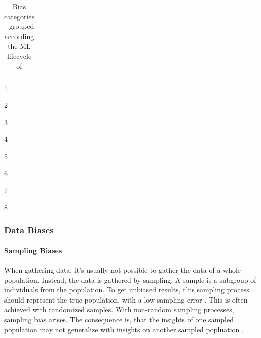 \begin{refsection}
\begin{table}[H]
\begin{threeparttable}
\begin{tabularx}{\textwidth}{>{\tblWidthDescription}X|>{\tblWidthContext}X|>{\tblWidthContext}X}
					\bottomrule
				\end{tabularx}
				\begin{tablenotes}
					\footnotesize
					\begin{minipage}{0.33\textwidth}\raggedright
						\item[1] \autocite{Mehrabi_2021}
						\item[2] \autocite{HP_2022}
						\item[3] \autocites{Mester_2022}
					\end{minipage}%
					\begin{minipage}{0.33\textwidth}\raggedright
						\item[4] \autocite{Chakraborty_2024}
						\item[5] \autocite{Young_2020}
						\item[6] \autocite{Montoya_2025}
					\end{minipage}%
					\begin{minipage}{0.33\textwidth}\raggedright
						\item[7] \autocites{Mester_2017}
						\item[8] \autocite{Delgado-Rodriguez_2004}
					\end{minipage}%
				\end{tablenotes}
			\end{threeparttable}
			\caption{Bias categories - grouped according the \gls{ML} lifecycle of \textcite{Mehrabi_2021}}
			\label{tab:biases_types}
		\end{table}
		
		\subsubsection{Data Biases}
		
		\paragraph{Sampling Biases}
		When gathering data, it's usually not possible to gather the data of a whole population. Instead, the data is gathered by sampling. A sample is a subgroup of individuals from the population. To get unbiased results, this sampling process should represent the true population, with a low sampling error \autocites{HP_2022}. This is often achieved with randomized samples. With non-random sampling processes, sampling bias arises. The consequence is, that the insights of one sampled population may not generalize with insights on another sampled popluation \autocite{Mehrabi_2021}.
		

\end{refsection}
